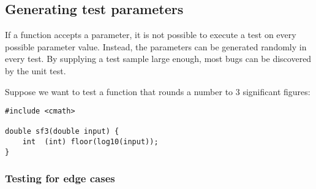 \subsection{Generating test parameters}
If a function accepts a parameter, it is not possible to execute a test on every possible parameter value.
Instead, the parameters can be generated randomly in every test.
By supplying a test sample large enough, most bugs can be discovered by the unit test.

Suppose we want to test a function that rounds a number to 3 significant figures:

\begin{lstlisting}[style=Cpp]
#include <cmath>

double sf3(double input) {
	int  (int) floor(log10(input));
}
\end{lstlisting}


\subsubsection{Testing for edge cases}
